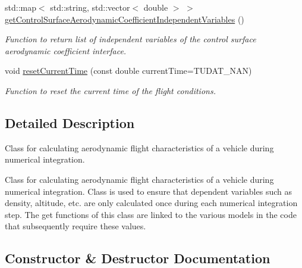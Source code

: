 \begin{DoxyCompactItemize}
std\+::map$<$ std\+::string, std\+::vector$<$ double $>$ $>$ \hyperlink{classtudat_1_1aerodynamics_1_1FlightConditions_ae3a53b8a97eecc77c2b3105f09b6a480}{get\+Control\+Surface\+Aerodynamic\+Coefficient\+Independent\+Variables} ()
\begin{DoxyCompactList}\small\item\em Function to return list of independent variables of the control surface aerodynamic coefficient interface. \end{DoxyCompactList}\item 
void \hyperlink{classtudat_1_1aerodynamics_1_1FlightConditions_a7687127ea0233711d3d4c1dd8cdcdb90}{reset\+Current\+Time} (const double current\+Time=T\+U\+D\+A\+T\+\_\+\+N\+AN)
\begin{DoxyCompactList}\small\item\em Function to reset the current time of the flight conditions. \end{DoxyCompactList}\end{DoxyCompactItemize}


\subsection{Detailed Description}
Class for calculating aerodynamic flight characteristics of a vehicle during numerical integration.

Class for calculating aerodynamic flight characteristics of a vehicle during numerical integration. Class is used to ensure that dependent variables such as density, altitude, etc. are only calculated once during each numerical integration step. The get functions of this class are linked to the various models in the code that subsequently require these values. 

\subsection{Constructor \& Destructor Documentation}

